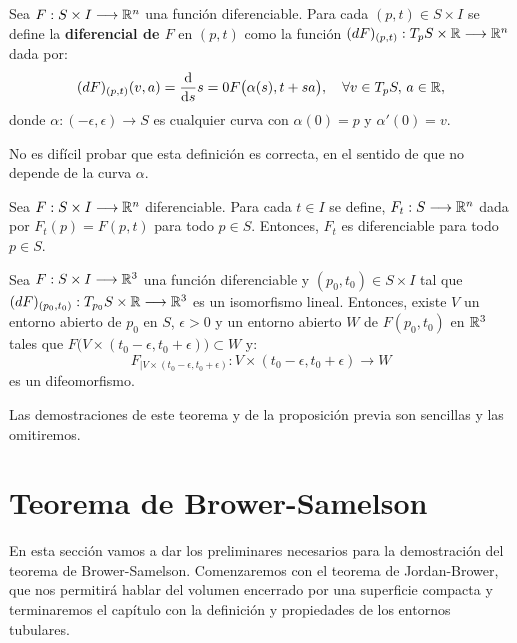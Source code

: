 \begin{definition}[Diferencial]
Sea $F: S \times I \longrightarrow \mathbb{R}^n$ una función diferenciable. Para cada $(p,t) \in S \times I$ se define la \textbf{diferencial de $F$} en $(p,t)$ como la función $(dF)_{(p,t)}: T_pS \times \mathbb{R} \longrightarrow \mathbb{R}^n$ dada por:
%
\begin{equation*}
    (dF)_{(p,t)}(v,a) = \diff{}{s}{s=0} F \big( \alpha(s), t+sa \big), \quad \forall v \in T_pS, \, a \in \rmath,
\end{equation*}
%
donde $\alpha:(-\epsilon, \epsilon) \longrightarrow S$ es cualquier curva con $\alpha(0)=p$ y $\alpha'(0)=v$.
\end{definition}

No es difícil probar que esta definición es correcta, en el sentido de que no depende de la curva $\alpha$.

\begin{proposition}
Sea $F: S \times I \longrightarrow \mathbb{R}^n$ diferenciable. Para cada $t\in I$ se define, $F_t: S \longrightarrow \mathbb{R}^n$ dada por $F_t(p) = F(p,t)$ para todo $p \in S$. Entonces, $F_t$ es diferenciable para todo $p \in S$.
\end{proposition}

\begin{theorem}
Sea $F: S \times I \longrightarrow \mathbb{R}^3$ una función diferenciable y $(p_0,t_0) \in S \times I$ tal que $(dF)_{(p_0,t_0)} : T_{p_0}S \times \mathbb{R} \longrightarrow \mathbb{R}^3$ es un isomorfismo lineal. Entonces, existe $V$ un entorno abierto de $p_0$ en $S$, $\epsilon > 0$ y un entorno abierto $W$ de $F(p_0, t_0)$ en $\mathbb{R}^3$ tales que $F \big( V \times (t_0-\epsilon, t_0+\epsilon) \big) \subset W$ y:
%
\begin{equation*}
    F_{|V \times (t_0-\epsilon, t_0+\epsilon)}: V \times (t_0-\epsilon, t_0+\epsilon) \longrightarrow W
\end{equation*}
%
es un difeomorfismo.
\end{theorem}

Las demostraciones de este teorema y de la proposición previa son sencillas y las omitiremos.

\section{Teorema de Brower-Samelson}

En esta sección vamos a dar los preliminares necesarios para la demostración del teorema de Brower-Samelson. Comenzaremos con el teorema de Jordan-Brower, que nos permitirá hablar del volumen encerrado por una superficie compacta y terminaremos el capítulo con la definición y propiedades de los entornos tubulares.

